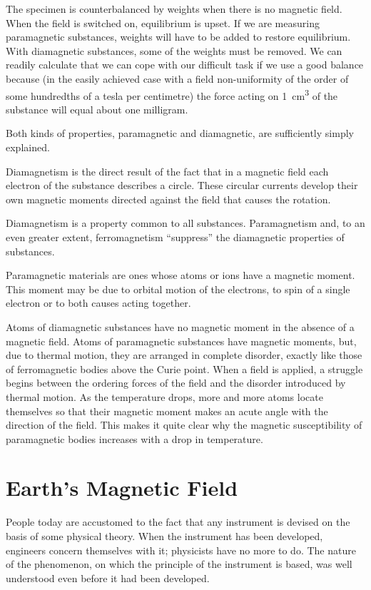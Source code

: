 The specimen is counterbalanced by weights when there is no magnetic field. When the field is switched on, equilibrium is upset. If we are measuring paramagnetic substances, weights will have to be added to restore equilibrium. With diamagnetic substances, some of the weights must be removed. We can readily calculate that we can cope with our difficult task if we use a good balance because (in the easily achieved case with a field non-uniformity of the order of some hundredths of a tesla per centimetre) the force acting on \SI{1}{\centi\meter\cubed} of the substance will equal about one milligram.

Both kinds of properties, paramagnetic and diamagnetic, are sufficiently simply explained.

Diamagnetism is the direct result of the fact that in a magnetic field each electron of the substance describes a circle. These circular currents develop their own magnetic moments directed against the field that causes the rotation.

Diamagnetism is a property common to all substances. Paramagnetism and, to an even greater extent, ferromagnetism ``suppress'' the diamagnetic properties of substances.

Paramagnetic materials are ones whose atoms or ions have a magnetic moment. This moment may be due to orbital motion of the electrons, to spin of a single electron or to both causes acting together.

Atoms of diamagnetic substances have no magnetic moment in the absence of a magnetic field. Atoms of paramagnetic substances have magnetic moments, but, due to thermal motion, they are arranged in complete disorder, exactly like those of ferromagnetic bodies above the Curie point. When a field is applied, a struggle begins between the ordering forces of the field and the disorder introduced by thermal motion. As the temperature drops, more and more atoms locate themselves so that their
magnetic moment makes an acute angle with the direction of the field. This makes it quite clear why the magnetic susceptibility of paramagnetic bodies increases with a drop in temperature.

\section{Earth's Magnetic Field}
People today are accustomed to the fact that any instrument is devised on the basis of some physical theory. When the instrument has been developed, engineers concern themselves with it; physicists have no more to do. The nature of the phenomenon, on which the principle of the instrument is based, was well understood even before it had been developed.

